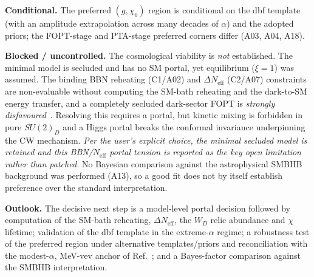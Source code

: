 \documentclass[11pt]{article}
\newcommand{\Neff}{N_{\mathrm{eff}}}
\newcommand{\chizero}{\chi_0}
\begin{document}
\textbf{Conditional.} The preferred $(g,\chizero)$ region is conditional on the dbf template (with an
amplitude extrapolation across many decades of $\alpha$) and the adopted priors; the FOPT-stage and
PTA-stage preferred corners differ (A03, A04, A18).

\textbf{Blocked / uncontrolled.} The cosmological viability is \emph{not} established. The minimal
model is secluded and has no SM portal, yet equilibrium ($\xi=1$) was assumed. The binding BBN
reheating (C1/A02) and $\Delta\Neff$ (C2/A07) constraints are non-evaluable without computing the
SM-bath reheating and the dark-to-SM energy transfer, and a completely secluded dark-sector FOPT is
\emph{strongly disfavoured}~\cite{Bringmann2023}. Resolving this requires a portal, but kinetic mixing
is forbidden in pure $SU(2)_D$ and a Higgs portal breaks the conformal invariance underpinning the CW
mechanism. \emph{Per the user's explicit choice, the minimal secluded model is retained and this
BBN/$\Neff$ portal tension is reported as the key open limitation rather than patched.} No Bayesian
comparison against the astrophysical SMBHB background was performed (A13), so a good fit does not by
itself establish preference over the standard interpretation.

\textbf{Outlook.} The decisive next step is a model-level portal decision followed by computation of the
SM-bath reheating, $\Delta\Neff$, the $W_D$ relic abundance and $\chi$ lifetime; validation of the dbf
template in the extreme-$\alpha$ regime; a robustness test of the preferred region under alternative
templates/priors and reconciliation with the modest-$\alpha$, MeV-vev anchor of Ref.~\cite{Borah2021};
and a Bayes-factor comparison against the SMBHB interpretation.
\end{document}
